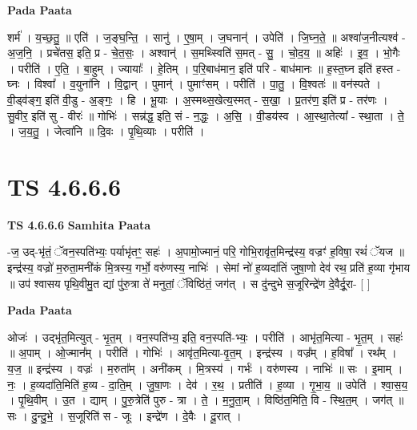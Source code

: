 \documentclass[17pt]{extarticle}
\begin{document}
\textbf{Pada Paata} \newline

शर्म॑ । य॒च्छ॒तु॒ ॥ एति॑ । ज॒ङ्घ॒न्ति॒ । सानु॑ । ए॒षा॒म् । ज॒घनान्॑ । उपेति॑ । जि॒घ्न॒ते॒ ॥ अश्वा॑ज॒नीत्यश्व॑ - अ॒ज॒नि॒ । प्रचे॑तस॒ इति॒ प्र - चे॒त॒सः॒ । अश्वान्॑ । स॒मथ्स्विति॑ स॒मत् - सु॒ । चो॒द॒य॒ ॥ अहिः॑ । इ॒व॒ । भो॒गैः । परीति॑ । ए॒ति॒ । बा॒हुम् । ज्यायाः᳚ । हे॒तिम् । प॒रि॒बाध॑मान॒ इति॑ परि - बाध॑मानः ॥ ह॒स्त॒घ्न इति॑ हस्त - घ्नः । विश्वा᳚ । व॒युना॑नि । वि॒द्वान् । पुमान्॑ । पुमाꣳ॑सम् । परीति॑ । पा॒तु॒ । वि॒श्वतः॑ ॥ वन॑स्पते । वी॒ड्व॑ङ्ग॒ इति॑ वी॒डु - अ॒ङ्गः॒ । हि । भू॒याः । अ॒स्मथ्स॒खेत्य॒स्मत् - स॒खा॒ । प्र॒तर॑ण॒ इति॑ प्र - तर॑णः । सु॒वीर॒ इति॑ सु - वीरः॑ ॥ गोभिः॑ । सन्न॑द्ध॒ इति॒ सं - न॒द्धः॒ । अ॒सि॒ । वी॒डय॑स्व । आ॒स्था॒तेत्या᳚ - स्था॒ता । ते॒ । ज॒य॒तु॒ । जेत्वा॑नि ॥ दि॒वः । पृ॒थि॒व्याः । परीति॑ ।  \newline




\section*{ TS 4.6.6.6 }

\textbf{TS 4.6.6.6 } \newline
\textbf{Samhita Paata} \newline

-ज॒ उद्-भृ॑तं॒ ॅवन॒स्पति॑भ्यः॒ पर्याभृ॑तꣳ॒॒ सहः॑ । अ॒पामो॒ज्मानं॒ परि॒ गोभि॒रावृ॑त॒मिन्द्र॑स्य॒ वज्रꣳ॑ ह॒विषा॒ रथं॑ ॅयज ॥ इन्द्र॑स्य॒ वज्रो॑ म॒रुता॒मनी॑कं मि॒त्रस्य॒ गर्भो॒ वरु॑णस्य॒ नाभिः॑ । सेमां नो॑ ह॒व्यदा॑तिं जुषा॒णो देव॑ रथ॒ प्रति॑ ह॒व्या गृ॑भाय ॥ उप॑ श्वासय पृथि॒वीमु॒त द्यां पु॑रु॒त्रा ते॑ मनुतां॒ ॅविष्ठि॑तं॒ जग॑त् । स दु॑न्दुभे स॒जूरिन्द्रे॑ण दे॒वैर्दू॒रा- [  ] \newline

\textbf{Pada Paata} \newline

ओजः॑ । उद्भृ॑त॒मित्युत् - भृ॒त॒म् । वन॒स्पति॑भ्य॒ इति॒ वन॒स्पति॑-भ्यः॒ । परीति॑ । आभृ॑त॒मित्या - भृ॒त॒म् । सहः॑ ॥ अ॒पाम् । ओ॒ज्मान᳚म् । परीति॑ । गोभिः॑ । आवृ॑त॒मित्या-वृ॒त॒म् । इन्द्र॑स्य । वज्र᳚म् । ह॒विषा᳚ । रथ᳚म् । य॒ज॒ ॥ इन्द्र॑स्य । वज्रः॑ । म॒रुता᳚म् । अनी॑कम् । मि॒त्रस्य॑ । गर्भः॑ । वरु॑णस्य । नाभिः॑ ॥ सः । इ॒माम् । नः॒ । ह॒व्यदा॑ति॒मिति॑ ह॒व्य - दा॒ति॒म् । जु॒षा॒णः । देव॑ । र॒थ॒ । प्रतीति॑ । ह॒व्या । गृ॒भा॒य॒ ॥ उपेति॑ । श्वा॒स॒य॒ । पृ॒थि॒वीम् । उ॒त । द्याम् । पु॒रु॒त्रेति॑ पुरु - त्रा । ते॒ । म॒नु॒ता॒म् । विष्ठि॑त॒मिति॒ वि - स्थि॒त॒म् । जग॑त् ॥ सः । दु॒न्दु॒भे॒ । स॒जूरिति॑ स - जूः । इन्द्रे॑ण । दे॒वैः । दू॒रात् ।  \newline
\end{document}
